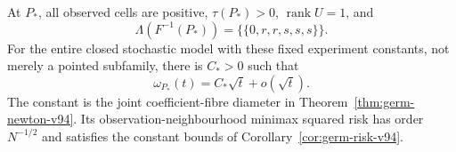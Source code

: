 \begin{theorem}
\label{thm:stochastic-intersection-v94}
At $P_*$, all observed cells are positive, $\tau(P_*)>0$,
$\operatorname{rank}U=1$, and
\begin{equation}\label{eq:cubic-fibre-v94}
 \Lambda(F^{-1}(P_*))=\{\{0,r,r,s,s,s\}\}.
\end{equation}
For the entire closed stochastic model with these fixed experiment
constants, not merely a pointed subfamily, there is $C_*>0$ such that
\begin{equation}\label{eq:cubic-modulus-v94}
 \omega_{P_*}(t)=C_*\sqrt t+o(\sqrt t).
\end{equation}
The constant is the joint coefficient-fibre diameter in
Theorem~\ref{thm:germ-newton-v94}. Its observation-neighbourhood
minimax squared risk has order $N^{-1/2}$ and satisfies the constant
bounds of Corollary~\ref{cor:germ-risk-v94}.
\end{theorem}
